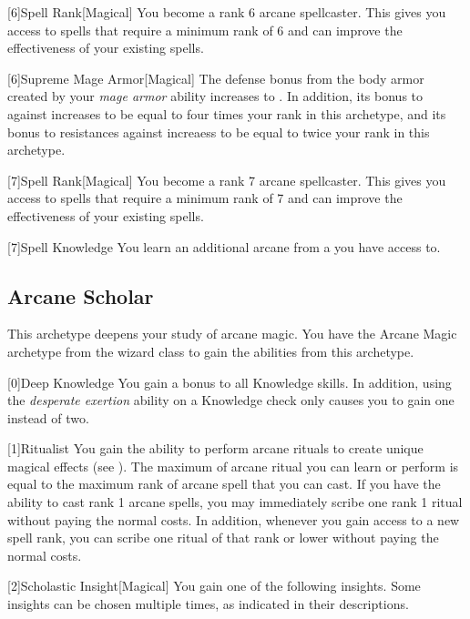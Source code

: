        [6]{Spell Rank}[Magical] You become a rank 6 arcane spellcaster.
        This gives you access to spells that require a minimum rank of 6 and can improve the effectiveness of your existing spells.

        [6]{Supreme Mage Armor}[Magical]
        The defense bonus from the body armor created by your \textit{mage armor} ability increases to .
        In addition, its bonus to  against  increases to be equal to four times your rank in this archetype, and its bonus to resistances against  increaess to be equal to twice your rank in this archetype.

        [7]{Spell Rank}[Magical] You become a rank 7 arcane spellcaster.
        This gives you access to spells that require a minimum rank of 7 and can improve the effectiveness of your existing spells.

        [7]{Spell Knowledge} You learn an additional arcane  from a  you have access to.

    \newpage
    \subsection{Arcane Scholar}
        This archetype deepens your study of arcane magic.
        You have the Arcane Magic archetype from the wizard class to gain the abilities from this archetype.

        [0]{Deep Knowledge} You gain a  bonus to all Knowledge skills.
        In addition, using the \textit{desperate exertion} ability on a Knowledge check only causes you to gain one  instead of two.

        [1]{Ritualist} You gain the ability to perform arcane rituals to create unique magical effects (see ).
        The maximum  of arcane ritual you can learn or perform is equal to the maximum rank of arcane spell that you can cast.
        If you have the ability to cast rank 1 arcane spells, you may immediately scribe one rank 1 ritual without paying the normal costs.
        In addition, whenever you gain access to a new spell rank, you can scribe one ritual of that rank or lower without paying the normal costs.

        [2]{Scholastic Insight}[Magical]
        You gain one of the following insights.
        Some insights can be chosen multiple times, as indicated in their descriptions.

